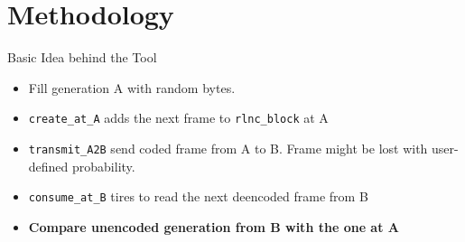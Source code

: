 \documentclass[t]{beamer} %
\begin{document}
\section{Methodology}
\begin{frame}{Basic Idea behind the Tool}
	\begin{figure}[htb]
	\end{figure}
	\pause
	\begin{itemize}
		\begin{itemize}
			\item Fill generation A with random bytes.
			      \pause
			\item \texttt{create\_at\_A} adds the next frame to \texttt{rlnc\_block} at A
			      \pause
			\item \texttt{transmit\_A2B} send coded frame from A to B. Frame might be lost with user-defined probability.
			      \pause
			\item \texttt{consume\_at\_B} tires to read the next deencoded frame from B
			      \pause
			\item \textbf{Compare unencoded generation from B with the one at A}
		\end{itemize}
	\end{itemize}
\end{frame}
\end{document}
